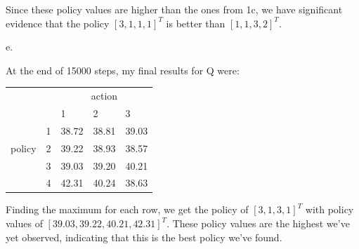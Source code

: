 \documentclass{article}
\begin{document}
Since these policy values are higher than the ones from 1c, we have significant evidence that the policy $[3,1,1,1]^T$ is better than $[1,1,3,2]^T$.

\noindent 
e. 

\noindent
At the end of 15000 steps, my final results for Q were:
\begin{table}[htb]
\begin{tabular}{lllll}
       &   & \multicolumn{3}{c}{action} \\
       &   & 1       & 2       & 3      \\
       & 1 & 38.72   & 38.81   & 39.03  \\
policy & 2 & 39.22   & 38.93   & 38.57  \\
       & 3 & 39.03   & 39.20   & 40.21  \\
       & 4 & 42.31   & 40.24   & 38.63 
\end{tabular}
\end{table}

\noindent 
Finding the maximum for each row, we get the policy of $[3,1,3,1]^T$ with policy values of $[39.03,39.22,40.21,42.31]^T$. These policy values are the highest we've yet observed, indicating that this is the best policy we've found.
\end{document}
